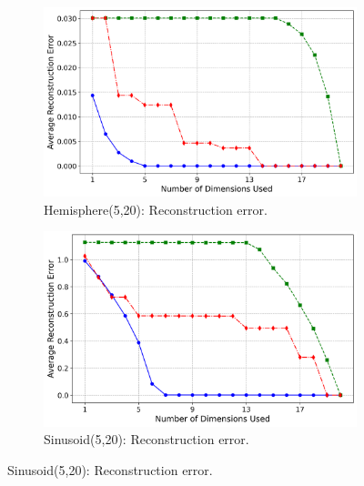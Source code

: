 \begin{figure}[h!]
    \vspace{0.5em} %

    \begin{subfigure}[b]{0.48\textwidth}
        \centering
        \includegraphics[width=\textwidth]{chapter5/results/visualisations/RAE/reconstruction/hemisphere_5_20/reconstruction_error_plot_normal_scale.png}
        \caption{Hemisphere(5,20): Reconstruction error.}
        \label{fig:hemisphere_reconstruction_errors}
    \end{subfigure}
    \hfill
    \begin{subfigure}[b]{0.48\textwidth}
        \centering
        \includegraphics[width=\textwidth]{chapter5/results/visualisations/RAE/reconstruction/sinusoid_5_20/reconstruction_error_plot_normal_scale.png}
        \caption{Sinusoid(5,20): Reconstruction error.}
        \label{fig:sinusoid_reconstruction_errors}
    \end{subfigure}


\end{figure}
